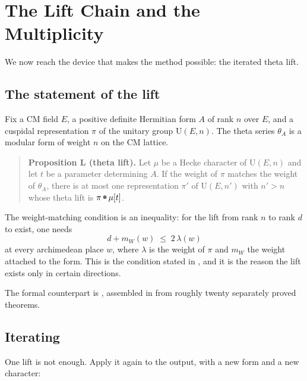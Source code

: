 
\chapter{The Lift Chain and the Multiplicity}
\label{ch:chain2}

We now reach the device that makes the method possible: the iterated theta
lift.

\section{The statement of the lift}Fix a CM field $E$, a positive definite Hermitian form $A$ of rank $n$ over
$E$, and a cuspidal representation $\pi$ of the unitary group
$\mathrm{U}(E,n)$. The theta series $\theta_A$ is a modular form of weight $n$
on the CM lattice.

\begin{quote}
\textbf{Proposition L (theta lift).} Let $\mu$ be a Hecke character of
$\mathrm{U}(E,n)$ and let $t$ be a parameter determining $A$. If the weight of
$\pi$ matches the weight of $\theta_A$, there is at most one representation
$\pi'$ of $\mathrm{U}(E,n')$ with $n' > n$ whose theta lift is $\pi \tboxplus
\mu[t]$.
\end{quote}

The weight-matching condition is an inequality: for the lift from rank $n$ to
rank $d$ to exist, one needs
\begin{equation}
d + m_W(w) \;\le\; 2\,\lambda(w)
\label{eq:weightineq2}
\end{equation}
at every archimedean place $w$, where $\lambda$ is the weight of $\pi$ and
$m_W$ the weight attached to the form. This is the condition stated in
, and it is the reason the lift exists only in
certain directions.

The formal counterpart is , assembled
in  from roughly twenty separately proved
theorems.

\section{Iterating}One lift is not enough. Apply it again to the output, with a new form and a
new character:

